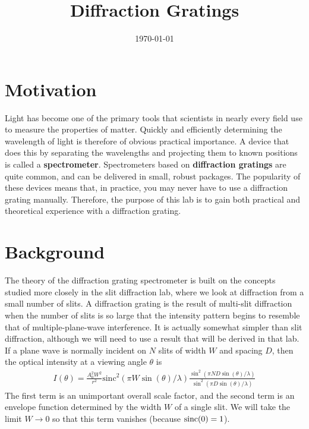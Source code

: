 \documentclass[]{manual}
\title{Diffraction Gratings}
\date{\today}
\begin{document}
    \maketitle
    \thispagestyle{firstpage}


    \section*{Motivation}

    Light has become one of the primary tools that scientists in nearly every field use to measure the properties of matter.
    Quickly and efficiently determining the wavelength of light is therefore of obvious practical importance.
    A device that does this by separating the wavelengths and projecting them to known positions is called a \textbf{spectrometer}.
    Spectrometers based on \textbf{diffraction gratings} are quite common, and can be delivered in small, robust packages.
    The popularity of these devices means that, in practice, you may never have to use a diffraction grating manually.
    Therefore, the purpose of this lab is to gain both practical and theoretical experience with a diffraction grating.

    \section*{Background}

    The theory of the diffraction grating spectrometer is built on the concepts studied more closely in the slit diffraction lab, where we look at diffraction from a small number of slits.
    A diffraction grating is the result of multi-slit diffraction when the number of slits is so large that the intensity pattern begins to resemble that of multiple-plane-wave interference.
    It is actually somewhat simpler than slit diffraction, although we will need to use a result that will be derived in that lab.
    If a plane wave is normally incident on $N$ slits of width $W$ and spacing $D$, then the optical intensity at a viewing angle $\theta$ is
    \begin{align}
        I(\theta) = \frac{A_0^2 W^2}{r^2} \mathrm{sinc}^2 \left(\pi W \sin(\theta) / \lambda\right)\frac{\sin^2(\pi N D \sin(\theta) / \lambda)}{\sin^2(\pi D \sin(\theta) / \lambda)}
    \end{align}
    The first term is an unimportant overall scale factor, and the second term is an envelope function determined by the width $W$ of a single slit.
    We will take the limit $W \to 0$ so that this term vanishes (because $\operatorname{sinc}(0) = 1$).
\end{document}
